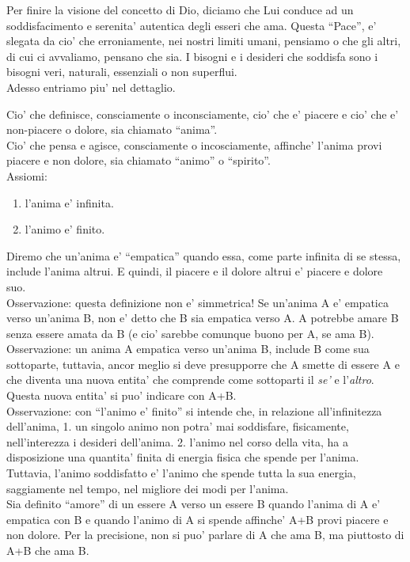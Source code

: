 Per finire la visione del concetto di Dio, diciamo che Lui conduce ad un soddisfacimento e serenita' autentica degli esseri che ama. Questa ``Pace'', e' slegata da cio' che erroniamente, nei nostri limiti umani, pensiamo o che gli altri, di cui ci avvaliamo, pensano che sia. I bisogni e i desideri che soddisfa sono i bisogni veri, naturali, essenziali o non superflui.\\

Adesso entriamo piu' nel dettaglio.

Cio' che definisce, consciamente o inconsciamente, cio' che e' piacere e cio' che e' non-piacere o dolore, sia chiamato ``anima''.\\
Cio' che pensa e agisce, consciamente o incosciamente, affinche' l'anima provi piacere e non dolore, sia chiamato ``animo'' o ``spirito''.\\

Assiomi:
\begin{enumerate}
    \item l'anima e' infinita.
    \item l'animo e' finito.
\end{enumerate}

Diremo che un'anima e' ``empatica'' quando essa, come parte infinita di se stessa, include l'anima altrui. E quindi, il piacere e il dolore altrui e' piacere e dolore suo. \\
Osservazione: questa definizione non e' simmetrica! Se un'anima A e' empatica verso un'anima B, non e' detto che B sia empatica verso A. A potrebbe amare B senza essere amata da B (e cio' sarebbe comunque buono per A, se ama B). \\
Osservazione: un anima A empatica verso un'anima B, include B come sua sottoparte, tuttavia, ancor meglio si deve presupporre che A smette di essere A e che diventa una nuova entita' che comprende come sottoparti il \emph{se'} e l'\emph{altro}. Questa nuova entita' si puo' indicare con A+B. \\
Osservazione: con ``l'animo e' finito'' si intende che, in relazione all'infinitezza dell'anima, 1. un singolo animo non potra' mai soddisfare, fisicamente, nell'interezza i desideri dell'anima. 2. l'animo nel corso della vita, ha a disposizione una quantita' finita di energia fisica che spende per l'anima. Tuttavia, l'animo soddisfatto e' l'animo che spende tutta la sua energia, saggiamente nel tempo, nel migliore dei modi per l'anima. \\

Sia definito ``amore'' di un essere A verso un essere B quando l'anima di A e' empatica con B e quando l'animo di A si spende affinche' A+B provi piacere e non dolore. Per la precisione, non si puo' parlare di A che ama B, ma piuttosto di A+B che ama B. 

